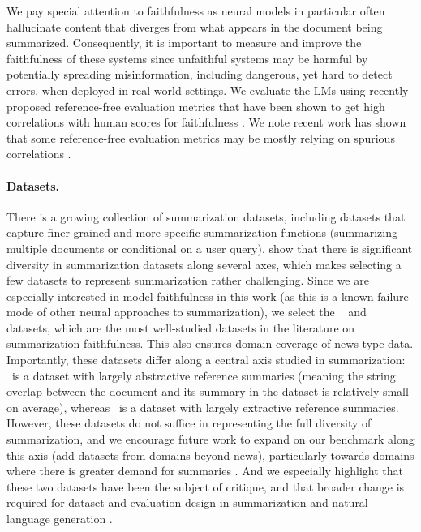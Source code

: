 We pay special attention to faithfulness as neural models in particular often hallucinate content that diverges from what appears in the document being summarized.
Consequently, it is important to measure and improve the faithfulness of these systems since unfaithful systems may be harmful by potentially spreading misinformation, including dangerous, yet hard to detect  errors, when deployed in real-world settings.
We evaluate the LMs using recently proposed reference-free evaluation metrics that have been shown to get high correlations with human scores for faithfulness \citep{10.1162/tacl_a_00453,fabbri-etal-2022-qafacteval}. 
We note recent work has shown that some reference-free evaluation metrics may be mostly relying on spurious correlations \citep{durmus-etal-2022-spurious}.


\paragraph{Datasets.} 
There is a growing collection of summarization datasets, including datasets that capture finer-grained and more specific summarization functions (\eg summarizing multiple documents or conditional on a user query).
\citet{bommasani2020intrinsic} show that there is significant diversity in summarization datasets along several axes, which makes selecting a few datasets to represent summarization rather challenging.
Since we are especially interested in model faithfulness in this work (as this is a known failure mode of other neural approaches to summarization), we select the \cnndm~\citep{10.5555/2969239.2969428} and \xsum~\citep{narayan-etal-2018-dont} datasets, which are the most well-studied datasets in the literature on summarization faithfulness.
This also ensures domain coverage of news-type data.
Importantly, these datasets differ along a central axis studied in summarization: \xsum~is a dataset with largely abstractive reference summaries (meaning the string overlap between the document and its summary in the dataset is relatively small on average), whereas \cnndm~is a dataset with largely extractive reference summaries. 
However, these datasets do not suffice in representing the full diversity of summarization, and we encourage future work to expand on our benchmark along this axis (\eg add datasets from domains beyond news), particularly towards domains where there is greater demand for summaries \citep[see][]{reiter2022summarization}.
And we especially highlight that these two datasets have been the subject of critique, and that broader change is required for dataset and evaluation design in summarization and natural language generation \citep{gehrmann2022repairing, reiter2022summarization}. 

